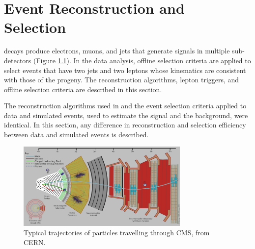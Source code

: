 \chapter{Event Reconstruction and Selection}
\label{sec:reco_chapter}

\WR decays produce electrons, muons, and jets that generate signals in multiple sub-detectors (Figure 
\ref{fig:particleTrajectories}).  In the data analysis, offline selection criteria are applied to select events that have two jets 
and two leptons whose kinematics are consistent with those of the \WR progeny.  The reconstruction algorithms, lepton triggers, and 
offline selection criteria are described in this section.

The reconstruction algorithms used in and the event selection criteria applied to data and simulated events, used to estimate the 
signal and the background, were identical.  In this section, any difference in reconstruction and selection efficiency between data 
and simulated events is described.

\begin{figure}[h]
	\centering
	\includegraphics[width=0.75\textwidth]{figures/flowOfParticlesThroughCMS.png}
	\caption{Typical trajectories of particles travelling through CMS, from CERN.}
	\label{fig:particleTrajectories}
\end{figure}


